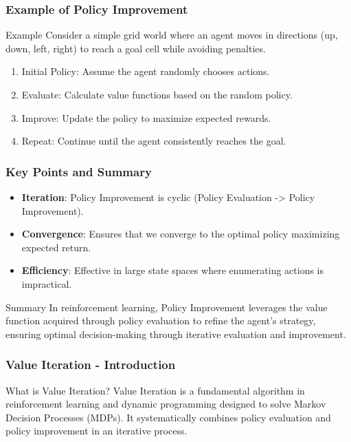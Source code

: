 \documentclass{beamer}
\begin{document}
\begin{frame}[fragile]
    \frametitle{Example of Policy Improvement}
    \begin{block}{Example}
        Consider a simple grid world where an agent moves in directions (up, down, left, right) to reach a goal cell while avoiding penalties.
        \begin{enumerate}
            \item Initial Policy: Assume the agent randomly chooses actions.
            \item Evaluate: Calculate value functions based on the random policy.
            \item Improve: Update the policy to maximize expected rewards.
            \item Repeat: Continue until the agent consistently reaches the goal.
        \end{enumerate}
    \end{block}
\end{frame}

\begin{frame}[fragile]
    \frametitle{Key Points and Summary}
    \begin{itemize}
        \item \textbf{Iteration}: Policy Improvement is cyclic (Policy Evaluation -> Policy Improvement).
        \item \textbf{Convergence}: Ensures that we converge to the optimal policy maximizing expected return.
        \item \textbf{Efficiency}: Effective in large state spaces where enumerating actions is impractical.
    \end{itemize}

    \begin{block}{Summary}
        In reinforcement learning, Policy Improvement leverages the value function acquired through policy evaluation to refine the agent's strategy, ensuring optimal decision-making through iterative evaluation and improvement.
    \end{block}
\end{frame}

\begin{frame}[fragile]
    \frametitle{Value Iteration - Introduction}
    \begin{block}{What is Value Iteration?}
        Value Iteration is a fundamental algorithm in reinforcement learning and dynamic programming designed to solve Markov Decision Processes (MDPs). 
        It systematically combines policy evaluation and policy improvement in an iterative process.
    \end{block}
\end{frame}
\end{document}
